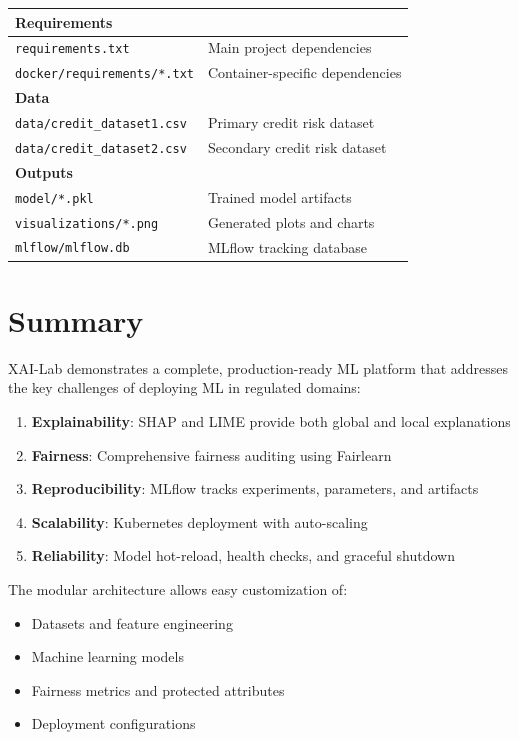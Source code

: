 \documentclass[11pt,a4paper]{article}
\begin{document}
\begin{longtable}{@{}p{4cm}p{9cm}@{}}
\midrule
\multicolumn{2}{l}{\textbf{Requirements}} \\
\midrule
\texttt{requirements.txt} & Main project dependencies \\
\texttt{docker/requirements/*.txt} & Container-specific dependencies \\

\midrule
\multicolumn{2}{l}{\textbf{Data}} \\
\midrule
\texttt{data/credit\_dataset1.csv} & Primary credit risk dataset \\
\texttt{data/credit\_dataset2.csv} & Secondary credit risk dataset \\

\midrule
\multicolumn{2}{l}{\textbf{Outputs}} \\
\midrule
\texttt{model/*.pkl} & Trained model artifacts \\
\texttt{visualizations/*.png} & Generated plots and charts \\
\texttt{mlflow/mlflow.db} & MLflow tracking database \\

\end{longtable}

\section{Summary}

XAI-Lab demonstrates a complete, production-ready ML platform that addresses the key challenges of deploying ML in regulated domains:

\begin{enumerate}
    \item \textbf{Explainability}: SHAP and LIME provide both global and local explanations
    \item \textbf{Fairness}: Comprehensive fairness auditing using Fairlearn
    \item \textbf{Reproducibility}: MLflow tracks experiments, parameters, and artifacts
    \item \textbf{Scalability}: Kubernetes deployment with auto-scaling
    \item \textbf{Reliability}: Model hot-reload, health checks, and graceful shutdown
\end{enumerate}

The modular architecture allows easy customization of:
\begin{itemize}
    \item Datasets and feature engineering
    \item Machine learning models
    \item Fairness metrics and protected attributes
    \item Deployment configurations
\end{itemize}
\end{document}
